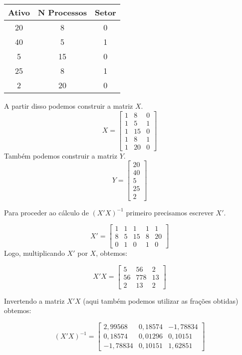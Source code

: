 \begin{center}
    \begin{tabular}{|c|c|c|}
        \hline
         Ativo & N Processos & Setor \\ \hline
         20 & 8 & 0 \\ \hline
         40 & 5 & 1 \\ \hline
         5 & 15 & 0 \\ \hline
         25 & 8 & 1 \\ \hline
         2 & 20 & 0 \\ \hline
    \end{tabular}
\end{center}

A partir disso podemos construir a matriz \(X\).
\[ X =
    \begin{bmatrix}
        1 & 8 & 0 \\
        1 & 5 & 1 \\
        1 & 15 & 0 \\
        1 & 8 & 1 \\
        1 & 20 & 0
    \end{bmatrix}
\]
Também podemos construir a matriz \(Y\).
\[ Y =
    \begin{bmatrix}
        20 \\
        40 \\
        5 \\
        25 \\
        2
    \end{bmatrix}
\]

Para proceder ao cálculo de \((X'X)^{-1}\) primeiro precisamos escrever \(X'\).

\[
    X' =
    \begin{bmatrix}
        1 & 1 & 1 & 1 & 1 \\
        8 & 5 & 15 & 8 & 20 \\
        0 & 1 & 0 & 1 & 0
    \end{bmatrix}
\]
Logo, multiplicando \(X'\) por \(X\), obtemos:

\[
    X'X =
    \begin{bmatrix}
        5 & 56 & 2 \\
        56 & 778 & 13 \\
        2 & 13 & 2
    \end{bmatrix}
\]

Invertendo a matriz \(X'X\) (aqui também podemos utilizar as frações obtidas) obtemos:

\[
    (X'X)^{-1} =
    \begin{bmatrix}
        2,99568 & 0,18574 & -1,78834 \\
        0,18574 & 0,01296 & 0,10151 \\
        -1,78834 & 0,10151 & 1,62851
    \end{bmatrix}
\]

